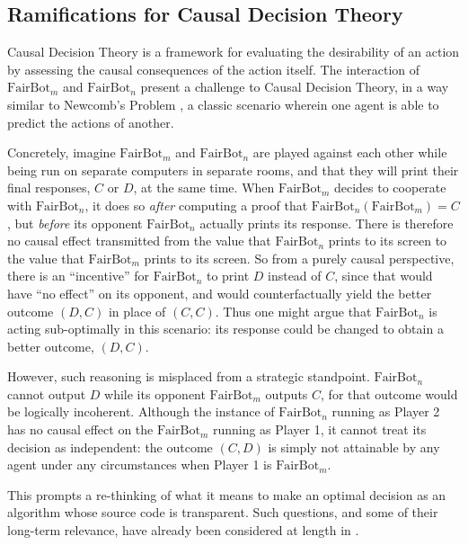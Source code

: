 \documentclass[onecolumn,authordate]{miri-tech-article}
\numberwithin{equation}{section}
\theoremstyle{definition}
\renewcommand{\-}{^{-1}}
\newcommand{\FB}{\mathrm{FairBot}}
\begin{document}
\subsection{Ramifications for Causal Decision Theory}\label{sec:cdt}
Causal Decision Theory \citep{Gibbard:1978} is a framework for evaluating the desirability of an action by assessing the causal consequences of the action itself.  The interaction of $\FB_m$ and $\FB_n$ present a challenge to Causal Decision Theory, in a way similar to Newcomb's Problem \citep{Nozick:1969}, a classic scenario wherein one agent is able to predict the actions of another.

Concretely, imagine $\FB_m$ and $\FB_n$ are played against each other while being run on separate computers in separate rooms, and that they will print their final responses, $C$ or $D$, at the same time.  When $\FB_m$ decides to cooperate with $\FB_n$, it does so {\em after} computing a proof that $\FB_n(\FB_m)=C$, but {\em before} its opponent $\FB_n$ actually prints its response.  There is therefore no causal effect transmitted from the value that $\FB_n$ prints to its screen to the value that $\FB_m$ prints to its screen.  So from a purely causal perspective, there is an ``incentive'' for $\FB_n$ to print $D$ instead of $C$, since that would have ``no effect'' on its opponent, and would counterfactually yield the better outcome $(D,C)$ in place of $(C,C)$.  Thus one might argue that $\FB_n$ is acting sub-optimally in this scenario: its response could be changed to obtain a better outcome, $(D,C)$.

However, such reasoning is misplaced from a strategic standpoint.  $\FB_n$ cannot output $D$ while its opponent $\FB_m$ outputs $C$, for that outcome would be logically incoherent.  Although the instance of $\FB_n$ running as Player 2 has no causal effect on the $\FB_m$ running as Player 1, it cannot treat its decision as independent: the outcome $(C,D)$ is simply not attainable by any agent under any circumstances when Player 1 is $\FB_m$.

This prompts a re-thinking of what it means to make an optimal decision as an algorithm whose source code is transparent.  Such questions, and some of their long-term relevance, have already been considered at length in \citet{Soares:2015:TowardIDT}.
\end{document}
